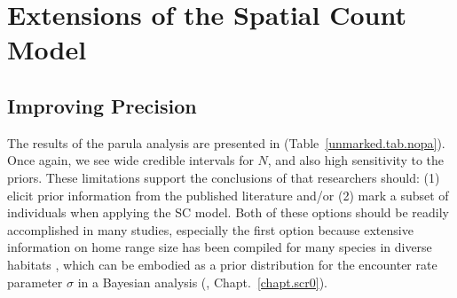 



\section{Extensions of the Spatial Count Model}
\label{unmarked.sec.ext}

\subsection{Improving Precision}



The results of the parula analysis are presented in
(Table~\ref{unmarked.tab.nopa}).
Once again, we see wide credible intervals for $N$,
and also high sensitivity to the
priors. These limitations support the conclusions of
\citet{chandler_royle:2012} that researchers should: (1) elicit prior
information from the published literature and/or (2) mark a subset of
individuals when applying the SC model. Both of these options should
be readily accomplished in many studies, especially the first option
because extensive information on home range size has
been compiled for many species in diverse habitats
\citep[e.g.][]{degraaf_yamasaki:2001}, which can be
embodied as a prior distribution for the
encounter rate parameter $\sigma$ in a Bayesian
analysis (\citet{chandler_royle:2012}, Chapt.~\ref{chapt.scr0}).


